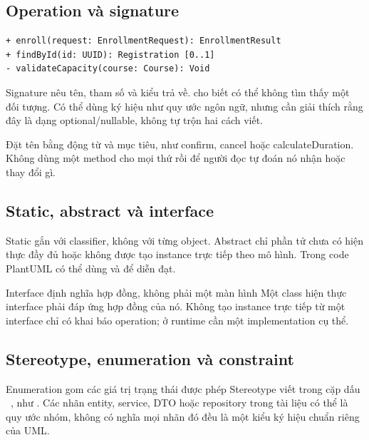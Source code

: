 \subsection{Operation và signature}
\begin{Verbatim}
+ enroll(request: EnrollmentRequest): EnrollmentResult
+ findById(id: UUID): Registration [0..1]
- validateCapacity(course: Course): Void
\end{Verbatim}
Signature nêu tên, tham số và kiểu trả về. \code{[0..1]} cho biết có thể không tìm thấy một đối tượng. Có thể dùng ký hiệu  như quy ước ngôn ngữ, nhưng cần giải thích rằng đây là dạng optional/nullable, không tự trộn hai cách viết.

Đặt tên bằng động từ và mục tiêu, như confirm, cancel hoặc calculateDuration. Không dùng một method  cho mọi thứ rồi để người đọc tự đoán nó nhận hoặc thay đổi gì.

\subsection{Static, abstract và interface}
Static gắn với classifier, không với từng object. Abstract chỉ phần tử chưa có hiện thực đầy đủ hoặc không được tạo instance trực tiếp theo mô hình. Trong code PlantUML có thể dùng  và  để diễn đạt.

  {Interface định nghĩa hợp đồng, không phải một màn hình}
Một class hiện thực interface phải đáp ứng hợp đồng của nó. Không tạo instance trực tiếp từ một interface chỉ có khai báo operation; ở runtime cần một implementation cụ thể.

\subsection{Stereotype, enumeration và constraint}
  {Enumeration gom các giá trị trạng thái được phép}
Stereotype viết trong cặp dấu \guillemotleft\ \guillemotright, như . Các nhãn entity, service, DTO hoặc repository trong tài liệu có thể là quy ước nhóm, không có nghĩa mọi nhãn đó đều là một kiểu ký hiệu chuẩn riêng của UML.


